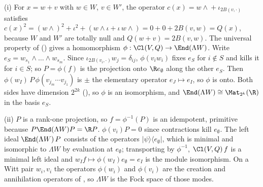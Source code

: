 (i) For $x = w + v$ with $w \in W$, $v \in W'$, the operator $c(x) = w \wedge {} + \iota_{2B(v, \cdot)}$ satisfies $c(x)^{2} = (w\wedge)^{2} + \iota^{2} + (w \wedge \iota + \iota\, w \wedge) = 0 + 0 + 2B(v, w) = Q(x)$, because $W$ and $W'$ are totally null and $Q(w + v) = 2B(v, w)$. The universal property of  () gives a homomorphism $\phi : \Cl(V, Q) \to \End(\Lambda W)$. Write $e_S = w_{s_1} \wedge \dots \wedge w_{s_m}$. Since $\iota_{2B(v_i, \cdot)} w_j = \delta_{ij}$, $\phi(v_i w_i)$ fixes $e_S$ for $i \notin S$ and kills it for $i \in S$; so $P = \phi(f)$ is the projection onto $\R e_\emptyset$ along the other $e_S$. Then $\phi(w_I)\, P\, \phi(v_{j_m} \cdots v_{j_1})$ is $\pm$ the elementary operator $e_J \mapsto e_I$, so $\phi$ is onto. Both sides have dimension $2^{2k}$ (), so $\phi$ is an isomorphism, and $\End(\Lambda W) \cong \Mat_{2^{k}}(\R)$ in the basis $e_S$.

(ii) $P$ is a rank-one projection, so $f = \phi^{-1}(P)$ is an idempotent, primitive because $P \End(\Lambda W) P = \R P$. $\phi(v_i) P = 0$ since contractions kill $e_\emptyset$. The left ideal $\End(\Lambda W)\, P$ consists of the operators $\lvert \psi \rangle \langle e_\emptyset \rvert$, which is minimal and isomorphic to $\Lambda W$ by evaluation at $e_\emptyset$; transporting by $\phi^{-1}$, $\Cl(V, Q)\, f$ is a minimal left ideal and $w_I f \mapsto \phi(w_I) e_\emptyset = e_I$ is the module isomorphism. On a Witt pair $w_i, v_i$ the operators $\phi(w_i)$ and $\phi(v_i)$ are the creation and annihilation operators of , so $\Lambda W$ is the Fock space of those modes.
